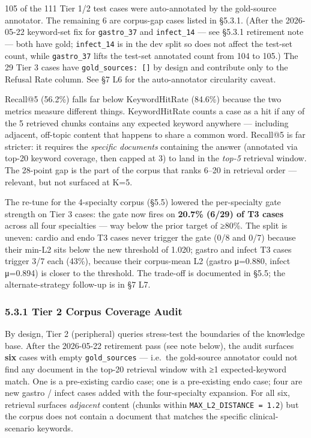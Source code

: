 \documentclass[
  american,
  a4paper,
]{article}
\begin{document}
105 of the 111 Tier 1/2 test cases were auto-annotated by the
gold-source annotator. The remaining 6 are corpus-gap cases listed in
§5.3.1. (After the 2026-05-22 keyword-set fix for \texttt{gastro\_37}
and \texttt{infect\_14} --- see §5.3.1 retirement note --- both have
gold; \texttt{infect\_14} is in the dev split so does not affect the
test-set count, while \texttt{gastro\_37} lifts the test-set annotated
count from 104 to 105.) The 29 Tier 3 cases have
\texttt{gold\_sources:\ {[}{]}} by design and contribute only to the
Refusal Rate column. See §7 L6 for the auto-annotator circularity
caveat.

Recall@5 (56.2\%) falls far below KeywordHitRate (84.6\%) because the
two metrics measure different things. KeywordHitRate counts a case as a
hit if any of the 5 retrieved chunks contains any expected keyword
anywhere --- including adjacent, off-topic content that happens to share
a common word. Recall@5 is far stricter: it requires the \emph{specific
documents} containing the answer (annotated via top-20 keyword coverage,
then capped at 3) to land in the \emph{top-5} retrieval window. The
28-point gap is the part of the corpus that ranks 6--20 in retrieval
order --- relevant, but not surfaced at K=5.

The re-tune for the 4-specialty corpus (§5.5) lowered the per-specialty
gate strength on Tier 3 cases: the gate now fires on \textbf{20.7\%
(6/29) of T3 cases} across all four specialties --- way below the prior
target of ≥80\%. The split is uneven: cardio and endo T3 cases never
trigger the gate (0/8 and 0/7) because their min-L2 sits below the new
threshold of 1.020; gastro and infect T3 cases trigger 3/7 each (43\%),
because their corpus-mean L2 (gastro μ=0.880, infect μ=0.894) is closer
to the threshold. The trade-off is documented in §5.5; the
alternate-strategy follow-up is in §7 L7.

\subsubsection{5.3.1 Tier 2 Corpus Coverage
Audit}\label{tier-2-corpus-coverage-audit}

By design, Tier 2 (peripheral) queries stress-test the boundaries of the
knowledge base. After the 2026-05-22 retirement pass (see note below),
the audit surfaces \textbf{six} cases with empty \texttt{gold\_sources}
--- i.e.~the gold-source annotator could not find any document in the
top-20 retrieval window with ≥1 expected-keyword match. One is a
pre-existing cardio case; one is a pre-existing endo case; four are new
gastro / infect cases added with the four-specialty expansion. For all
six, retrieval surfaces \emph{adjacent} content (chunks within
\texttt{MAX\_L2\_DISTANCE\ =\ 1.2}) but the corpus does not contain a
document that matches the specific clinical-scenario keywords.
\end{document}
